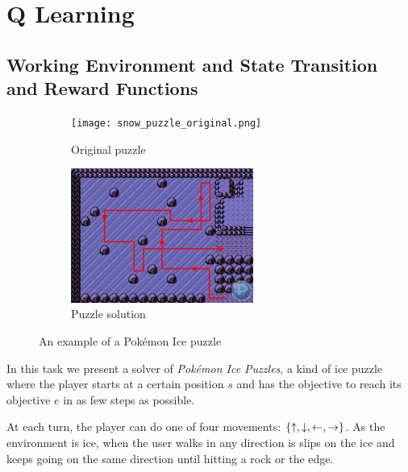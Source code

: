 \renewcommand{\thesection}{Basic Task}

\newcommand{\upa}{\mathlarger{\uparrow}}
\newcommand{\downa}{\mathlarger{\downarrow}}
\newcommand{\lefta}{\mathlarger{\leftarrow}}
\newcommand{\righta}{\mathlarger{\rightarrow}}

\section{Q Learning}

\subsection{Working Environment and State Transition and Reward Functions}

\begin{figure}[h]
	\begin{subfigure}{.49\textwidth}
		\centering
		\texttt{[image: snow\_puzzle\_original.png]}
		\caption{Original puzzle}
	\end{subfigure}
	\begin{subfigure}{.49\textwidth}
		\centering
		\includegraphics[height=125pt]{snow_2.png}
		\caption{Puzzle solution}
	\end{subfigure}
	\caption{An example of a Pokémon Ice puzzle}
	\label{large_map}
\end{figure}

In this task we present a solver of \emph{Pokémon Ice Puzzles}, a kind of ice puzzle where the player starts at a certain position $s$ and has the objective to reach its objective $e$ in as few steps as possible.

At each turn, the player can do one of four movements: $\{\upa, \downa, \lefta, \righta\}$.
As the environment is ice, when the user walks in any direction is slips on the ice and keeps going on the same direction until hitting a rock or the edge.

